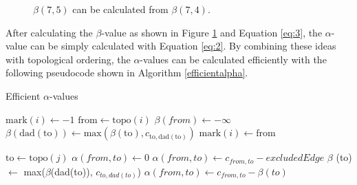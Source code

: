 \documentclass[english, 12pt, a4paper, sci, utf8, a-1b, online]{aaltothesis}
\begin{document}
\begin{figure}[H]
\centering
{} 
\caption{$\beta (7, 5)$ can be calculated from $\beta(7, 4)$.} \label{fig:case3}
\end{figure}

After calculating the $\beta$-value as shown in Figure \ref{fig:case3} and Equation \ref{eq:3}, the $\alpha$-value can be simply calculated with Equation \ref{eq:2}. By combining these ideas with topological ordering, the $\alpha$-values can be calculated efficiently with the following pseudocode shown in Algorithm \ref{efficientalpha}.

\begin{algorithm}[H]
	\caption{Efficient $\alpha$-values} 
	\begin{algorithmic}[1]
	        \State $\text{mark}(i) \leftarrow -1$
	    \EndFor
	        \State $\text{from} \leftarrow \text{topo}(i)$
	        \State $\beta(from) \leftarrow -\infty$
	            \State $\beta(\text{dad}(\text{to})) \leftarrow \text{max}(\beta (\text{to}), c_{\text{to}, \text{dad} (\text{to})})$
	            \State $\text{mark}(i) \leftarrow \text{from}$
	        \EndFor
	        
	            \State $\text{to} \leftarrow \text{topo}(j)$
	                		\State $\alpha(from, to) \leftarrow 0$
	                \Else
	                		\State $\alpha(from, to) \leftarrow c_{from, to} - excludedEdge$
	                \EndIf
	            \Else 
	                    \State $\beta$ (to) $\leftarrow$ max($\beta$(dad(to)), $c_{to, dad(to)}$)
	                \EndIf
	                \State $\alpha(from, to) \leftarrow c_{from, to} - \beta(to)$
	            \EndIf
	        \EndFor
	    \EndFor
	\end{algorithmic} 
	\label{efficientalpha}
\end{algorithm}
\end{document}

